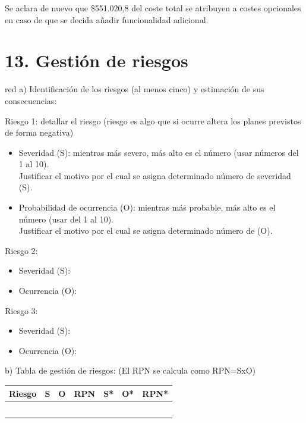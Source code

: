 \documentclass[
11pt, %
]{Clases/charter}
\begin{document}
Se aclara de nuevo que \$551.020,8 del coste total se atribuyen a costes opcionales en caso de que se decida añadir funcionalidad adicional.

\section{13. Gestión de riesgos}
\label{sec:riesgos}

\begin{consigna}{red}
	a) Identificación de los riesgos (al menos cinco) y estimación de sus consecuencias:

	Riesgo 1: detallar el riesgo (riesgo es algo que si ocurre altera los planes previstos de forma negativa)
	\begin{itemize}
		\item Severidad (S): mientras más severo, más alto es el número (usar números del 1 al 10).\\
		      Justificar el motivo por el cual se asigna determinado número de severidad (S).
		\item Probabilidad de ocurrencia (O): mientras más probable, más alto es el número (usar del 1 al 10).\\
		      Justificar el motivo por el cual se asigna determinado número de (O).
	\end{itemize}

	Riesgo 2:
	\begin{itemize}
		\item Severidad (S):
		\item Ocurrencia (O):
	\end{itemize}

	Riesgo 3:
	\begin{itemize}
		\item Severidad (S):
		\item Ocurrencia (O):
	\end{itemize}


	b) Tabla de gestión de riesgos:      (El RPN se calcula como RPN=SxO)

	\begin{table}[htpb]
		\centering
		\begin{tabularx}{\linewidth}{@{}|X|c|c|c|c|c|c|@{}}
			\hline
			\rowcolor[HTML]{C0C0C0}
			Riesgo & S & O & RPN & S* & O* & RPN* \\ \hline
			       &   &   &     &    &    &      \\ \hline
			       &   &   &     &    &    &      \\ \hline
			       &   &   &     &    &    &      \\ \hline
			       &   &   &     &    &    &      \\ \hline
			       &   &   &     &    &    &      \\ \hline
		\end{tabularx}%
	\end{table}


\end{consigna}
\end{document}
